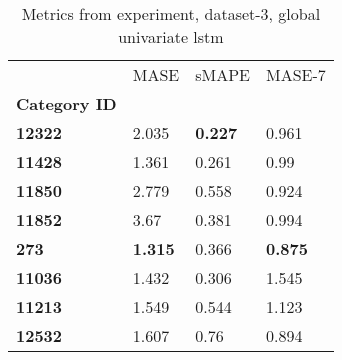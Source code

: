 \begin{table}[H]
\centering
\caption{Metrics from experiment, dataset-3, global univariate lstm}
\label{table:global-univariate-lstm-dataset-3}
\begin{tabular}{llll}
\toprule
{} &            MASE &           sMAPE &          MASE-7 \\
\textbf{Category ID} &                 &                 &                 \\
\midrule
\textbf{12322      } &           2.035 &  \textbf{0.227} &           0.961 \\
\textbf{11428      } &           1.361 &           0.261 &            0.99 \\
\textbf{11850      } &           2.779 &           0.558 &           0.924 \\
\textbf{11852      } &            3.67 &           0.381 &           0.994 \\
\textbf{273        } &  \textbf{1.315} &           0.366 &  \textbf{0.875} \\
\textbf{11036      } &           1.432 &           0.306 &           1.545 \\
\textbf{11213      } &           1.549 &           0.544 &           1.123 \\
\textbf{12532      } &           1.607 &            0.76 &           0.894 \\
\bottomrule
\end{tabular}
\end{table}
